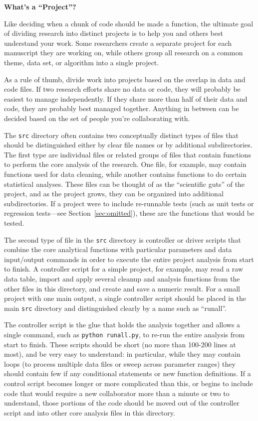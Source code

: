 \documentclass[10pt]{article}
\begin{document}
\begin{framed}
\noindent \textbf{What's a ``Project''?}

Like deciding when a chunk of code should be made a function, the
ultimate goal of dividing research into distinct projects is to help you
and others best understand your work. Some researchers create a separate
project for each manuscript they are working on, while others group all
research on a common theme, data set, or algorithm into a single
project.

As a rule of thumb, divide work into projects based on the overlap in
data and code files. If two research efforts share no data or code, they
will probably be easiest to manage independently. If they share more
than half of their data and code, they are probably best managed
together. Anything in between can be decided based on the set of people
you're collaborating with.
\end{framed}

The \texttt{src} directory often contains two conceptually distinct
types of files that should be distinguished either by clear file names
or by additional subdirectories. The first type are individual files
or related groups of files that contain functions to perform the core
analysis of the research. One file, for example, may contain functions
used for data cleaning, while another contains functions to do certain
statistical analyses. These files can be thought of as the
``scientific guts'' of the project, and as the project grows, they can
be organized into additional subdirectories. If a project were to
include re-runnable tests (such as unit tests or regression
tests---see Section~\ref{sec:omitted}), these are the
functions that would be tested.

The second type of file in the \texttt{src} directory is controller or
driver scripts that combine the core analytical functions with
particular parameters and data input/output commands in order to execute
the entire project analysis from start to finish. A controller script
for a simple project, for example, may read a raw data table, import and
apply several cleanup and analysis functions from the other files in
this directory, and create and save a numeric result. For a small
project with one main output, a single controller script should be
placed in the main \texttt{src} directory and distinguished clearly by a
name such as ``runall''.

The controller script is the glue that holds the analysis together and
allows a single command, such as \texttt{python runall.py}, to re-run
the entire analysis from start to finish. These scripts should be short
(no more than 100-200 lines at most), and be very easy to understand: in
particular, while they may contain loops (to process multiple data files
or sweep across parameter ranges) they should contain few if any
conditional statements or new function definitions. If a control script
becomes longer or more complicated than this, or begins to include code
that would require a new collaborator more than a minute or two to
understand, those portions of the code should be moved out of the
controller script and into other core analysis files in this directory.
\end{document}

